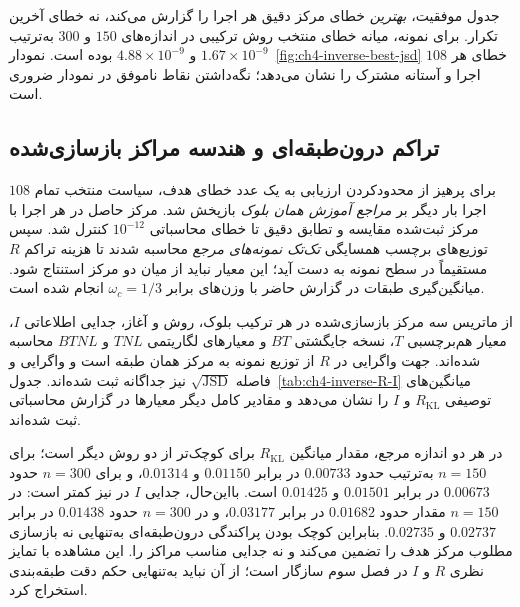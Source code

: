 جدول موفقیت، \emph{بهترین} خطای مرکز دقیق هر اجرا را گزارش می‌کند، نه خطای آخرین تکرار. برای نمونه، میانه خطای منتخب روش ترکیبی در اندازه‌های $150$ و $300$ به‌ترتیب $1.67\times10^{-9}$ و $4.88\times10^{-9}$ بوده است. نمودار~\ref{fig:ch4-inverse-best-jsd} خطای هر $108$ اجرا و آستانه مشترک را نشان می‌دهد؛ نگه‌داشتن نقاط ناموفق در نمودار ضروری است.



\subsection{تراکم درون‌طبقه‌ای و هندسه مراکز بازسازی‌شده}
\label{subsec:ch4-inverse-center-geometry}
برای پرهیز از محدودکردن ارزیابی به یک عدد خطای هدف، سیاست منتخب تمام $108$ اجرا بار دیگر بر \emph{مراجع آموزش همان بلوک} بازپخش شد. مرکز حاصل در هر اجرا با مرکز ثبت‌شده مقایسه و تطابق  دقیق تا خطای محاسباتی $10^{-12}$ کنترل شد. سپس توزیع‌های برچسب همسایگی \emph{تک‌تک نمونه‌های مرجع} محاسبه شدند تا هزینه تراکم $R$ مستقیماً در سطح نمونه به دست آید؛ این معیار نباید از  میان دو مرکز استنتاج شود. میانگین‌گیری طبقات در گزارش حاضر با وزن‌های برابر $\omega_c=1/3$ انجام شده است.

از ماتریس سه مرکز بازسازی‌شده در هر ترکیب بلوک، روش و آغاز، جدایی اطلاعاتی $I$، معیار هم‌برچسبی $T$، نسخه جایگشتی $BT$ و معیارهای لگاریتمی $TNL$ و $BTNL$ محاسبه شده‌اند. جهت واگرایی  در $R$ از توزیع نمونه به مرکز همان طبقه است و واگرایی  و فاصله $\sqrt{\operatorname{JSD}}$ نیز جداگانه ثبت شده‌اند. جدول~\ref{tab:ch4-inverse-R-I} میانگین‌های توصیفی $R_{\mathrm{KL}}$ و $I$ را نشان می‌دهد و مقادیر کامل دیگر معیارها در گزارش محاسباتی ثبت شده‌اند.



در هر دو اندازه مرجع، مقدار میانگین $R_{\mathrm{KL}}$ برای  کوچک‌تر از دو روش دیگر است؛ برای $n=150$ به‌ترتیب حدود $0.00733$ در برابر $0.01150$ و $0.01314$، و برای $n=300$ حدود $0.00673$ در برابر $0.01501$ و $0.01425$ است. بااین‌حال، جدایی $I$ در  نیز کمتر است: در $n=150$ مقدار حدود $0.01682$ در برابر $0.03177$، و در $n=300$ حدود $0.01438$ در برابر $0.02737$ و $0.02735$. بنابراین کوچک بودن پراکندگی درون‌طبقه‌ای به‌تنهایی نه بازسازی مطلوب مرکز هدف را تضمین می‌کند و نه جدایی مناسب مراکز را. این مشاهده با تمایز نظری $R$ و $I$ در فصل سوم سازگار است؛ از آن نباید به‌تنهایی حکم دقت طبقه‌بندی استخراج کرد.



